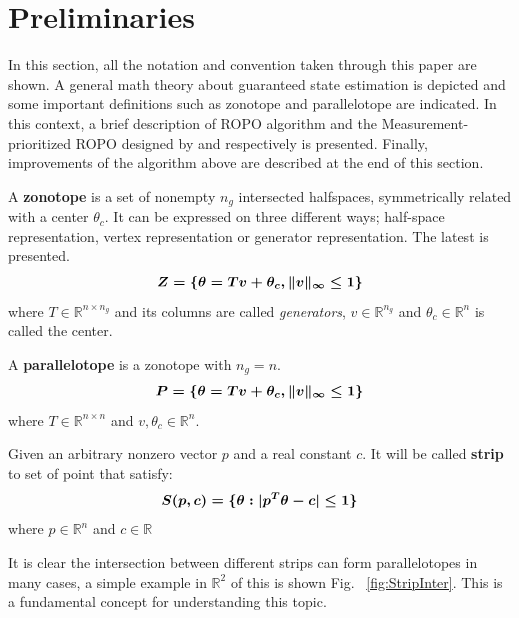 \documentclass{ifacconf}
\def\ve#1{\mathchoice{\mbox{\boldmath$\displaystyle#1$}}
{\mbox{\boldmath$\textstyle#1$}}
{\mbox{\boldmath$\scriptstyle#1$}}
{\mbox{\boldmath$\scriptscriptstyle#1$}}}
\begin{document}
\section{Preliminaries}\label{sec:estim}
In this section, all the notation and convention taken through this paper are shown. A general math theory about guaranteed state estimation is depicted and some important definitions such as zonotope and parallelotope are indicated. In this context, a brief description of  ROPO algorithm and the Measurement-prioritized ROPO designed by \citep{Zappa1996} and \citep{udit2018} respectively is presented. Finally, improvements of the algorithm above are described at the end of this section.
\\
\begin{defn}
A \textbf{zonotope} is a set of nonempty $n_{g}$ intersected halfspaces, symmetrically related with a center $\theta_{c}$. It can be expressed on three different ways; half-space representation, vertex representation or generator representation. The latest is presented. 
\begin{equation}
\label{eq:ZonotopeDef}
\ve{Z=\{\theta=Tv+\theta_{c},\|v\|_{\infty}\leq1\}}
\end{equation}  
where $T\in \mathbb{R}^{n\times n_{g}}$ and its columns are called \textit{generators}, $v \in \mathbb{R}^{n_{g}}$ and $\theta_{c} \in \mathbb{R}^{n}$ is called the center.
\end{defn}
\begin{defn}
\label{eq:ParallelotopeDef}
A \textbf{parallelotope} is a zonotope with $n_{g}=n$.
\begin{equation}
\ve{P=\{\theta=Tv+\theta_{c},\|v\|_{\infty}\leq1\}}
\end{equation}  
where $T\in \mathbb{R}^{n\times n}$ and $v, \theta_{c} \in \mathbb{R}^{n}$.
\end{defn}
\begin{defn}
Given an arbitrary nonzero vector $p$ and a real constant $c$. It will be called \textbf{strip} to set of point that satisfy:
	\begin{equation}
	\label{eq:stripdef}
		\ve{S(p,c)=\{\theta:|p^{T}\theta-c| \leq 1\}}
	\end{equation}  
where $p\in \mathbb{R}^{n}$ and $c\in \mathbb{R}$
\end{defn}
It is clear the intersection between different strips can form parallelotopes in many cases, a simple example in $\mathbb{R}^2$ of this is shown Fig. ~\ref{fig:StripInter}. This is a fundamental concept for understanding this topic.
\end{document}
